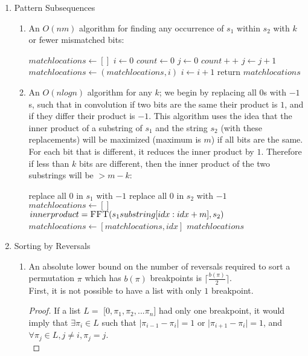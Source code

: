 \documentclass[a4paper]{article}
\begin{document}
\begin{enumerate}
\item Pattern Subsequences
	\begin{enumerate}
	\item An $O(nm)$ algorithm for finding any occurrence of $s_1$ within $s_2$ with $k$ or fewer mismatched bits:
		\begin{algorithmic}
		\State $matchlocations \gets [ ]$
		\State $i \gets 0$
			\State $count \gets 0$
			\State $j \gets 0$
					\State $count++$
				\EndIf
				\State $j \gets j + 1$
			\EndFor
				\State $matchlocations \gets (matchlocations, i)$
			\EndIf
			\State $i \gets i + 1$
		\EndFor
		\State return $matchlocations$
		\end{algorithmic}
	\item An $O(n log n)$ algorithm for any $k$; we begin by replacing all $0$s with $-1$s, such that in convolution if two bits are the same their product is $1$, and if they differ their product is $-1$. This algorithm uses the idea that the inner product of a substring of $s_1$ and the string $s_2$ (with these replacements) will be maximized (maximum is $m$) if all bits are the same.  For each bit that is different, it reduces the inner product by $1$.  Therefore if less than $k$ bits are different, then the inner product of the two substrings will be $> m-k$:
		\begin{algorithmic}
		\State replace all $0$ in $s_1$ with $-1$
		\State replace all $0$ in $s_2$ with $-1$
		\State $matchlocations \gets [ ]$
		\For{$idx = 1, 2, ... n-m$}
			\State $innerproduct = \Call{FFT}{s_1 substring [idx:idx+m], s_2 }$
			\If{$innerproduct > m-k$}
				\State $matchlocations \gets [matchlocations, idx]$
			\EndIf
		\EndFor
		\State \Return $matchlocations$
		\end{algorithmic}
	\end{enumerate}
\item Sorting by Reversals
	\begin{enumerate}
	\item An absolute lower bound on the number of reversals required to sort a permutation $\pi$ which has $b(\pi)$ breakpoints is $\lceil \frac{b(\pi)}{2} \rceil$.\\
	First, it is not possible to have a list with only $1$ breakpoint.
	\begin{proof}
	If a list $L =$ [$0, \pi_1, \pi_2, ... \pi_n$] had only one breakpoint, it would imply that $\exists \pi_i \in L$ such that $\lvert \pi_{i-1} - \pi_i \rvert = 1$ or $\lvert \pi_{i+1} - \pi_i \rvert = 1$, and $\forall \pi_j \in L, j \neq i, \pi_j = j$.\\

\end{proof}
\end{enumerate}
\end{enumerate}
\end{document}
